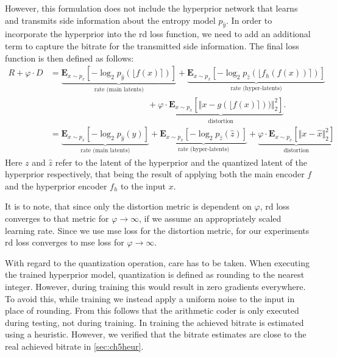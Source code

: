 However, this formulation does not include the hyperprior network that learns and transmits side information about the entropy model $p_{\hat{y}}$. In order to incorporate the hyperprior into the \ac{rd} loss function, we need to add an additional term to capture the bitrate for the transmitted side information. The final loss function is then defined as follows:
\begin{align}
R + \varphi \cdot D &= \underbrace{\mathbf{E}_{x\sim p_x} [ -\log_2 p_{\hat{y}}(\lfloor f(x)\rceil)]}_\text{rate (main latents)} + 
\underbrace{\mathbf{E}_{x\sim p_x} [ -\log_2 p_{\hat{z}}(\lfloor f_h(f(x))\rceil)]}_\text{rate (hyper-latents)}\\ 
&\qquad\qquad\qquad\qquad\qquad\quad\:\: + \underbrace{\varphi \cdot\mathbf{E}_{x\sim p_x} [\Vert x - g(\lfloor f(x)\rceil))\Vert^2_2]}_\text{distortion}.\\
&=\underbrace{\mathbf{E}_{x\sim p_x} [ -\log_2 p_{\hat{y}}(\hat{y})]}_\text{rate (main latents)} + 
\underbrace{\mathbf{E}_{x\sim p_x} [ -\log_2 p_{\hat{z}}(\hat{z})]}_\text{rate (hyper-latents)} + \underbrace{\varphi \cdot\mathbf{E}_{x\sim p_x} [\Vert x - \hat{x}\Vert^2_2]}_\text{distortion}
\end{align}
Here $z$ and $\hat{z}$ refer to the latent of the hyperprior and the quantized latent of the hyperprior respectively, that being the result of applying both the main encoder $f$ and the hyperprior encoder $f_h$ to the input $x$.

It is to note, that since only the distortion metric is dependent on $\varphi$, \ac{rd} loss converges to that metric for $\varphi\rightarrow\infty$, if we assume an appropriately scaled learning rate. Since we use \ac{mse} loss for the distortion metric, for our experiments \ac{rd} loss converges to \ac{mse} loss for $\varphi\rightarrow\infty$.

With regard to the quantization operation, care has to be taken. When executing the trained hyperprior model, quantization is defined as rounding to the nearest integer. However, during training this would result in zero gradients everywhere. To avoid this, while training we instead apply a uniform noise to the input in place of rounding. From this follows that the arithmetic coder is only executed during testing, not during training. In training the achieved bitrate is estimated using a heuristic. However, we verified that the bitrate estimates are close to the real achieved bitrate in \autoref{sec:ch5heur}.
